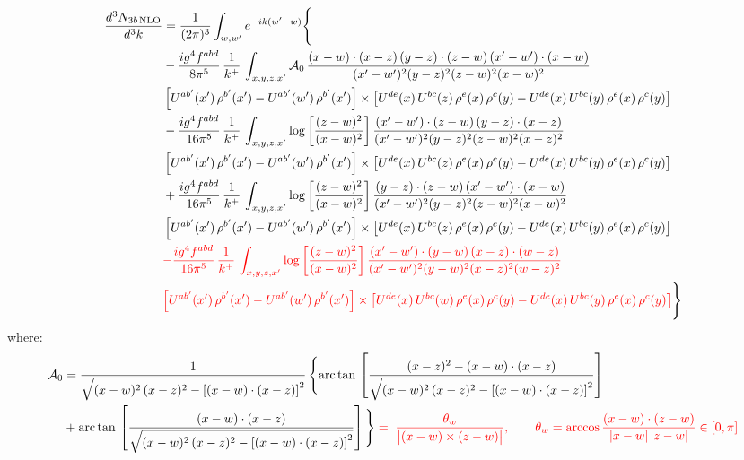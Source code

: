 \documentclass[9pt]{article}
\numberwithin{equation}{section}
\begin{document}
\begin{align}
\frac{d^{3}N_{3b\,\rm NLO}}{d^{3}k} & = \frac{1}{(2\pi)^{3}}\int_{w,w'}e^{-ik(w'-w)}\Bigg\{\notag \\
&-\frac{ig^{4}f^{abd}}{8\pi^{5}}\,\frac{1}{k^{+}}\,\int_{x,y,z,x'}\mathcal{A}_{0}\,
\frac{(x-w)\cdot(x-z)\,(y-z)\cdot(z-w)\,(x'-w')\cdot(x-w)}{(x'-w')^{2}(y-z)^{2}(z-w)^{2}(x-w)^{2}}\notag \\ & \left[U^{ab'}(x')\,\rho^{b'}(x')-U^{ab'}(w')\, \rho^{b'}(x')\right]\times \left[U^{de}(x)\,U^{bc}(z)\, \rho^{e}(x)\,\rho^{c}(y)-U^{de}(x)\,U^{bc}(y)\,\rho^{e}(x)\,\rho^{c}(y)\right] \notag \\
& -\frac{ig^{4}f^{abd}}{16\pi^{5}}\,\frac{1}{k^{+}}\,\int_{x,y,z,x'}\log{\left[\frac{(z-w)^{2}}{(x-w)^{2}}\right]}\,
\frac{(x'-w')\cdot(z-w)\,(y-z)\cdot(x-z)}{(x'-w')^{2}(y-z)^{2}(z-w)^{2}(x-z)^{2}}\notag \\
&\left[U^{ab'}(x')\,\rho^{b'}(x')-U^{ab'}(w')\, \rho^{b'}(x')\right]\times \left[U^{de}(x)\,U^{bc}(z)\, \rho^{e}(x)\,\rho^{c}(y)-U^{de}(x)\,U^{bc}(y)\,\rho^{e}(x)\,\rho^{c}(y)\right] \notag \\
&+ \frac{ig^{4}f^{abd}}{16\pi^{5}}\,\frac{1}{k^{+}}\,\int_{x,y,z,x'}\log{\left[\frac{(z-w)^{2}}{(x-w)^{2}}\right]}\,
\frac{(y-z)\cdot(z-w)\,(x'-w')\cdot(x-w)}{(x'-w')^{2}(y-z)^{2}(z-w)^{2}(x-w)^{2}}\notag \\ 
& \left[U^{ab'}(x')\,\rho^{b'}(x')-U^{ab'}(w')\, \rho^{b'}(x')\right]\times \left[U^{de}(x)\,U^{bc}(z)\, \rho^{e}(x)\,\rho^{c}(y)-U^{de}(x)\,U^{bc}(y)\,\rho^{e}(x)\,\rho^{c}(y)\right]\notag \\ & {\color{red}-\frac{ig^{4}f^{abd}}{16\pi^{5}}\,\frac{1}{k^{+}}\,\int_{x,y,z,x'}\log{\left[\frac{(z-w)^{2}}{(x-w)^{2}}\right]}\,\frac{(x'-w')\cdot(y-w)\,(x-z)\cdot(w-z)}{(x'-w')^{2}(y-w)^{2}(x-z)^{2}(w-z)^{2}}}\notag \\ & {\color{red}\left[U^{ab'}(x')\,\rho^{b'}(x')-U^{ab'}(w')\, \rho^{b'}(x')\right]\times \left[U^{de}(x)\,U^{bc}(w)\, \rho^{e}(x)\,\rho^{c}(y)-U^{de}(x)\,U^{bc}(y)\,\rho^{e}(x)\,\rho^{c}(y)\right]}\Bigg\}
\end{align}
where: \begin{align}
\mathcal{A}_{0} & = \frac{1}{\sqrt{(x-w)^{2}\,(x-z)^{2}-\left[(x-w)\cdot (x-z)\right]^{2}}}\, \Bigg\{\mathrm{arc\,tan}\,\left[\frac{(x-z)^{2}-(x-w)\cdot (x-z)}{\sqrt{(x-w)^{2}\,(x-z)^{2}-\left[(x-w)\cdot (x-z)\right]^{2}}}\right]\notag \\ & + \mathrm{arc\,tan}\,\left[\frac{(x-w)\cdot (x-z)}{\sqrt{(x-w)^{2}\,(x-z)^{2}-\left[(x-w)\cdot (x-z)\right]^{2}}}\right] \Bigg\}
{\color{red}\;=\;\frac{\theta_{w}}{\big|(x-w)\times(z-w)\big|},\qquad \theta_{w}=\arccos\frac{(x-w)\cdot(z-w)}{|x-w|\,|z-w|}\in[0,\pi]}
\end{align}
\end{document}

